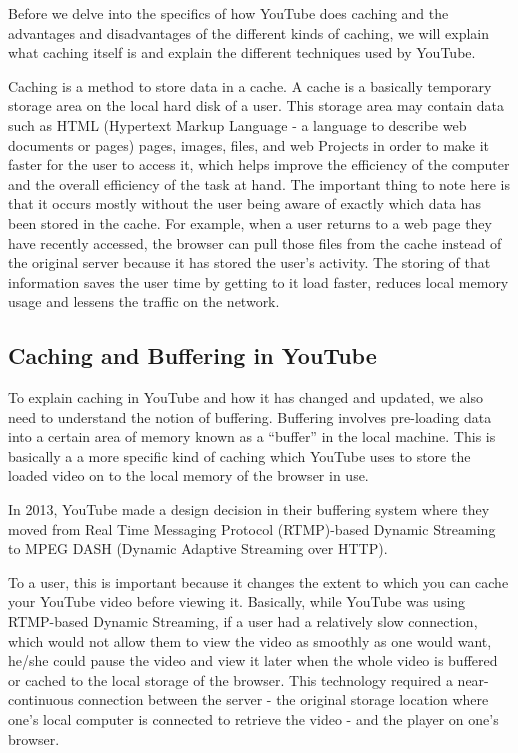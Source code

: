 Before we delve into the specifics of how YouTube does caching and the advantages and disadvantages of the different kinds of caching, we will explain what caching itself is and explain the different techniques used by YouTube.

Caching is a method to store data in a cache. A cache is a basically temporary storage area on the local hard disk of a user. This storage area may contain data such as HTML (Hypertext Markup Language - a language to describe web documents or pages) pages, images, files, and web Projects in order to make it faster for the user to access it, which helps improve the efficiency of the computer and the overall efficiency of the task at hand. The important thing to note here is that it occurs mostly without the user being aware of exactly which data has been stored in the cache. For example, when a user returns to a web page they have recently accessed, the browser can pull those files from the cache instead of the original server because it has stored the user's activity. The storing of that information saves the user time by getting to it load faster, reduces local memory usage and lessens the traffic on the network.


\subsection{Caching and Buffering in YouTube}
To explain caching in YouTube and how it has changed and updated, we also need to understand the notion of buffering. Buffering involves pre-loading data into a certain area of memory known as a ``buffer'' in the local machine. This is basically a a more specific kind of caching which YouTube uses to store the loaded video on to the local memory of the browser in use.

In 2013, YouTube made a design decision in their buffering system where they moved from Real Time Messaging Protocol (RTMP)-based Dynamic Streaming to MPEG DASH (Dynamic Adaptive Streaming over HTTP).

To a user, this is important because it changes the extent to which you can cache your YouTube video before viewing it. Basically, while YouTube was using RTMP-based Dynamic Streaming, if a user had a relatively slow connection, which would not allow them to view the video as smoothly as one would want, he/she could pause the video and view it later when the whole video is buffered or cached to the local storage of the browser. This technology required a near-continuous connection between the server - the original storage location where one's local computer is connected to retrieve the video - and the player on one's browser.

